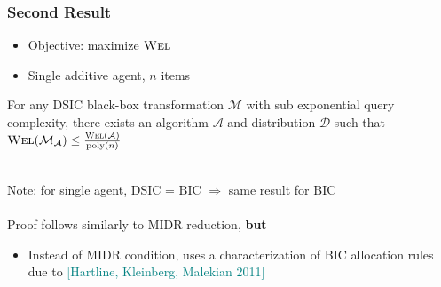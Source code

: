 \documentclass[hyperref={pdfpagelabels=false}]{beamer}
\renewcommand{\footnotesize}{\scriptsize}
\newcommand{\refscolorz}{teal} %
\newcommand{\Wel}{\textsc{Wel}}
\newcommand\Dist{\mathcal{D}}
\newcommand\Algo{\mathcal{A}}
\newcommand\Mech{\mathcal{M}}
\newcommand\Domain{\mathcal{X}}
\newcommand\Range{\mathcal{Y}}
\begin{document}
 \begin{frame}
 \frametitle{Second Result}

 \begin{itemize}
		\item Objective: maximize $\Wel$
		\item Single additive agent, $n$ items
	\end{itemize}

		\begin{theorem}\label{thm:BIC_formal}
			For any DSIC black-box transformation $\Mech$ with sub exponential query
			complexity, there exists an algorithm $\Algo$ and distribution $\Dist$ such
			that $\Wel(\Mech_{\Algo}) \le \frac{ \Wel(\Algo) }{\text{poly}(n)}$
	\end{theorem}
	\mbox{}\\
	Note: for single agent, DSIC = BIC $\Rightarrow$ same result for BIC\\
	\mbox{}\\ 

	Proof follows similarly to MIDR reduction, \textbf{but}
	\begin{itemize}
		\item Instead of MIDR condition, uses a characterization of BIC allocation rules due to 
				{\footnotesize
				\textcolor{\refscolorz}{[Hartline, Kleinberg, Malekian 2011]}}
	\end{itemize}
		
 \end{frame}
\end{document}
